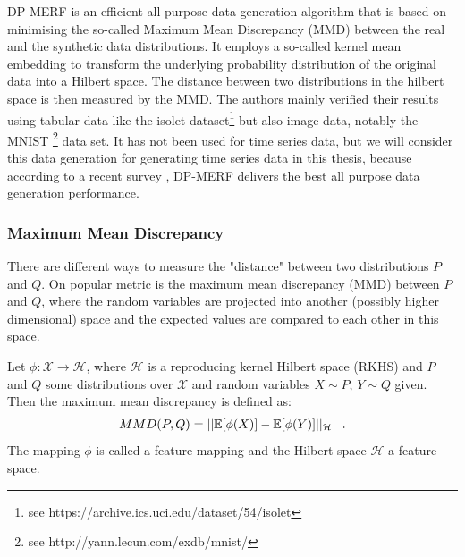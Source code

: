 DP-MERF \parencite{dpmerf} is an efficient all purpose data generation algorithm that is based on minimising the so-called Maximum Mean Discrepancy (MMD) between the real and the synthetic data distributions. It employs a so-called kernel mean embedding to transform the underlying probability distribution of the original data into a Hilbert space. The distance between two distributions in the hilbert space is then measured by the MMD. The authors mainly verified their results using tabular data like the isolet dataset\footnote{see https://archive.ics.uci.edu/dataset/54/isolet} but also image data, notably the MNIST \footnote{see http://yann.lecun.com/exdb/mnist/} data set. It has not been used for time series data, but we will consider this data generation for generating time series data in this thesis, because according to a recent survey \parencite{hu2023sok}, DP-MERF delivers the best all purpose data generation performance.

\subsubsection{Maximum Mean Discrepancy}
There are different ways to measure the "distance" between two distributions $P$ and $Q$. On popular metric is the maximum mean discrepancy (MMD) between $P$ and $Q$, where the random variables are projected into another (possibly higher dimensional) space and the expected values are compared to each other in this space.

\begin{definition}[MMD]
    Let $\phi: \mathcal{X} \rightarrow \mathcal{H}$, where $\mathcal{H}$ is a reproducing kernel Hilbert space (RKHS) and $P$ and $Q$ some distributions over $\mathcal{X}$ and random variables $X \sim P$, $Y \sim Q$ given. Then the maximum mean discrepancy is defined as:
    \begin{align}
        MMD(P,Q)=|| \mathbb{E}[\phi(X)] - \mathbb{E}[\phi(Y)] ||_\mathcal{H} \;\;\;.
    \end{align}
    The mapping $\phi$ is called a feature mapping and the Hilbert space $\mathcal{H}$ a feature space.
\end{definition}

